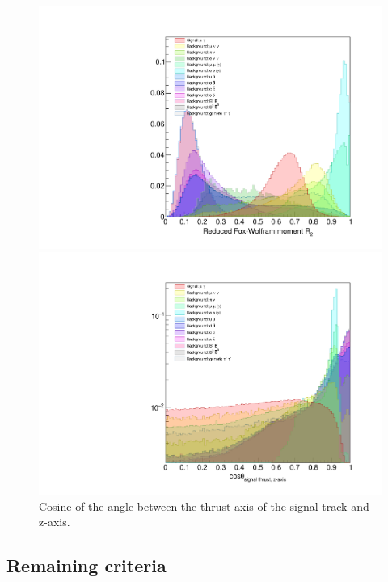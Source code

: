 \documentclass[12pt]{thesis}  %
\begin{document}
\begin{figure}[h]
\centering
\begin{minipage}{.475\textwidth}
  \centering
  \includegraphics[width=\linewidth]{images/tauMG-R2.pdf}
  \caption[]%
  {{\small Reduced Fox-Wolfram moment $R_2$.}}
  \label{fig:tauMG R2}
\end{minipage}%
\hfill
\begin{minipage}{.475\textwidth}
  \centering
  \includegraphics[width=\linewidth]{images/tauMG-cosTBz.pdf}
  \caption[]%
  {{\small Cosine of the angle between the thrust axis of the signal track and z-axis.}}  \label{fig:tauMG cosTBz}
\end{minipage}
\end{figure}


\subsection{Remaining criteria}
\end{document}

